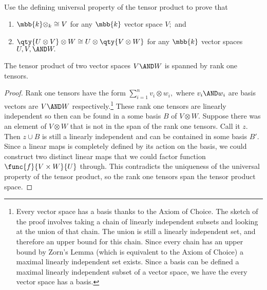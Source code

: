 \documentclass[main.tex]{subfiles}
\begin{document}
\paragraph{}

\begin{exercise}Use the defining universal property of the tensor product
	to prove that 
	\begin{enumerate}
		\item $ \mbb{k}\otimes_k\cong V $ for any $ \mbb{k} $ vector space $ V; $ and
		\item $ \qty{U\otimes V}\otimes W\cong U\otimes\qty{V\otimes W} $ for any $ \mbb{k} $ vector spaces $ U,V,\AND W. $
	\end{enumerate}
\end{exercise}
\begin{lemma}
	The tensor product of two vector spaces $ V\AND W $ is spanned by rank one 
	tensors.
\end{lemma}
\begin{proof}
	Rank one tensors have the form $ \sum_{i=1}^n v_i\otimes w_i,$ where
	$ v_i\AND w_i $ are basis vectors are $ V\AND W$ 
	respectively.\footnote{Every vector space has a basis thanks to the Axiom 
	of Choice. The sketch of the proof involves taking a chain of linearly 
	independent subsets and looking at the union of that chain. The union is 
	still a linearly independent set, and therefore an upper bound for this
	chain. Since every chain has an upper bound by Zorn's Lemma (which is 
	equivalent to the Axiom of Choice) a maximal linearly independent set 
	exists. Since a basis can be defined a maximal linearly independent subset 
	of a vector space, we have the every vector space has a basis. }
	These rank one tensors are linearly independent so then can be found in a 
	some basis $ B $ of $ V\otimes W. $ Suppose there was an element of $ 
	V\otimes W $ that is not in	the span of the rank one tensors. Call it $ z. $
	Then $ z \cup B $ is still a linearly independent and can be contained in
	some basis $ B'. $ Since a linear maps is completely defined by its action
	on the basis, we could construct two distinct linear maps that we could 
	factor function $ \func{f}{V\times W}{U} $ through. This contradicts
	the uniqueness of the universal property of the tensor product,
	so the rank one tensors span the tensor product space. 

\end{proof}
	
\end{document}
